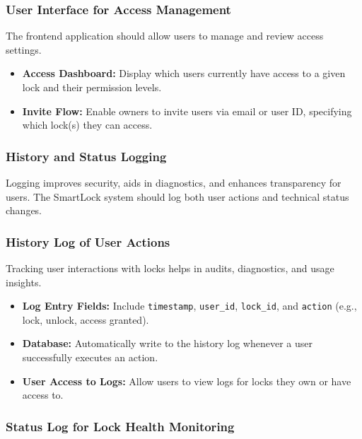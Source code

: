 \subsubsection*{User Interface for Access Management}

The frontend application should allow users to manage and review access settings.

\begin{itemize}
  \item \textbf{Access Dashboard:} Display which users currently have access to a given lock and their permission levels.
  \item \textbf{Invite Flow:} Enable owners to invite users via email or user ID, specifying which lock(s) they can access.
\end{itemize}

%
%
%
%

\subsubsection{History and Status Logging}

 Logging improves security, aids in diagnostics, and enhances transparency for users. The SmartLock system should log both user actions and technical status changes.

\subsubsection*{History Log of User Actions}

Tracking user interactions with locks helps in audits, diagnostics, and usage insights.

\begin{itemize}
  \item \textbf{Log Entry Fields:} Include \texttt{timestamp}, \texttt{user\_id}, \texttt{lock\_id}, and \texttt{action} (e.g., lock, unlock, access granted).
  \item \textbf{Database:} Automatically write to the history log whenever a user successfully executes an action.
  \item \textbf{User Access to Logs:} Allow users to view logs for locks they own or have access to.
\end{itemize}

\subsubsection*{Status Log for Lock Health Monitoring}

